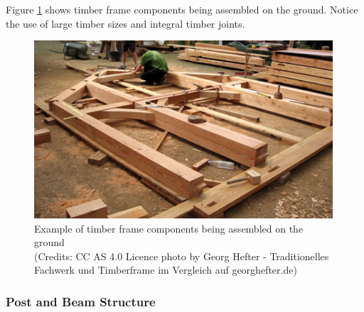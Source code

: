 Figure \ref{fig:example-timber-frame-on-ground} shows timber frame components being assembled on the ground. Notice the use of large timber sizes and integral timber joints. 

\begin{figure}
    \centering
    \includegraphics[width=0.99\textwidth]{images/01/Fachwerk_Abbund.jpg}
    \caption[Example of timber frame components being assembled on the ground]
    {Example of timber frame components being assembled on the ground \\
        \footnotesize{(Credits: CC AS 4.0 Licence photo by Georg Hefter - Traditionelles Fachwerk und Timberframe im Vergleich auf georghefter.de)}}
    \label{fig:example-timber-frame-on-ground}
\end{figure}

\subsubsection{Post and Beam Structure}
\label{subsubsection:introduction-post-and-beam-structure}

